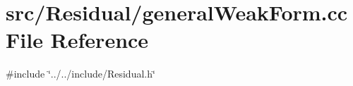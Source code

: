 \section{src/\+Residual/general\+Weak\+Form.cc File Reference}
\label{general_weak_form_8cc}
{\ttfamily \#include \char`\"{}../../include/\+Residual.\+h\char`\"{}}\newline
